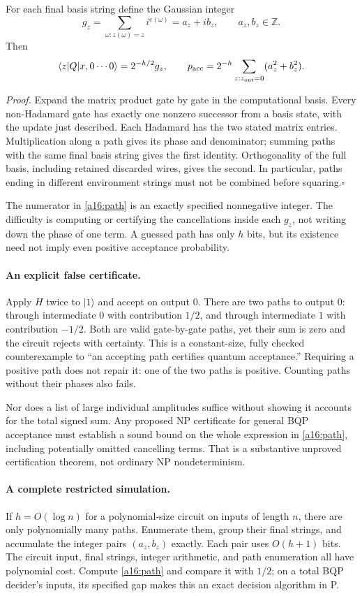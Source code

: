 \documentclass[11pt]{article}
\begin{document}
For each final basis string define the Gaussian integer
\[
 g_z=\sum_{\omega:z(\omega)=z}i^{e(\omega)}=a_z+i b_z,
 \qquad a_z,b_z\in\mathbb Z.
\]
Then
\begin{equation}\label{a16:path}
 \langle z|Q|x,0\cdots0\rangle=2^{-h/2}g_z,
 \qquad
 p_{\rm acc}=2^{-h}\sum_{z:z_{\rm out}=0}(a_z^2+b_z^2).
\end{equation}

\emph{Proof.} Expand the matrix product gate by gate in the computational
basis. Every non-Hadamard gate has exactly one nonzero successor from a basis
state, with the update just described. Each Hadamard has the two stated
matrix entries. Multiplication along a path gives its phase and denominator;
summing paths with the same final basis string gives the first identity.
Orthogonality of the full basis, including retained discarded wires, gives
the second. In particular, paths ending in different environment strings
must not be combined before squaring.\hfill$\square$

The numerator in \eqref{a16:path} is an exactly specified nonnegative integer.
The difficulty is computing or certifying the cancellations inside each $g_z$,
not writing down the phase of one term. A guessed path has only $h$ bits,
but its existence need not imply even positive acceptance probability.

\paragraph{An explicit false certificate.}
Apply $H$ twice to $|1\rangle$ and accept on output $0$. There are two paths
to output $0$: through intermediate $0$ with contribution $1/2$, and through
intermediate $1$ with contribution $-1/2$. Both are valid gate-by-gate paths,
yet their sum is zero and the circuit rejects with certainty. This is a
constant-size, fully checked counterexample to ``an accepting path certifies
quantum acceptance.'' Requiring a positive path does not repair it: one of
the two paths is positive. Counting paths without their phases also fails.

Nor does a list of large individual amplitudes suffice without showing it
accounts for the total signed sum. Any proposed NP certificate for general
BQP acceptance must establish a sound bound on the whole expression in
\eqref{a16:path}, including potentially omitted cancelling terms. That is
a substantive unproved certification theorem, not ordinary NP nondeterminism.

\paragraph{A complete restricted simulation.}
If $h=O(\log n)$ for a polynomial-size circuit on inputs of length $n$,
there are only polynomially many paths. Enumerate them, group their final
strings, and accumulate the integer pairs $(a_z,b_z)$ exactly. Each pair
uses $O(h+1)$ bits. The circuit input, final strings, integer arithmetic,
and path enumeration all have polynomial cost. Compute
\eqref{a16:path} and compare it with $1/2$; on a total BQP decider's inputs,
its specified gap makes this an exact decision algorithm in P.
\end{document}
